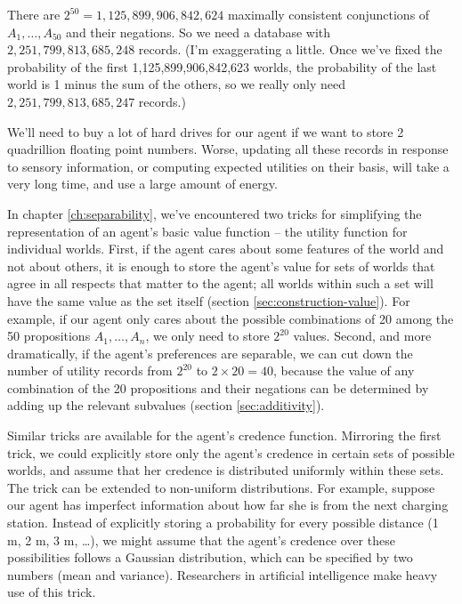 
There are $2^{50} = 1,125,899,906,842,624$ maximally consistent
conjunctions of $A_1,\ldots,A_{50}$ and their negations.  So we need a
database with $2,251,799,813,685,248$ records. (I'm exaggerating a
little. Once we've fixed the probability of the first
1,125,899,906,842,623 worlds, the probability of the last world is 1
minus the sum of the others, so we really only need
$2,251,799,813,685,247$ records.)

We'll need to buy a lot of hard drives for our agent if we want to
store 2 quadrillion floating point numbers. Worse, updating all these
records in response to sensory information, or computing expected
utilities on their basis, will take a very long time, and use a large
amount of energy.

In chapter \ref{ch:separability}, we've encountered two tricks for
simplifying the representation of an agent's basic value function --
the utility function for individual worlds. First, if the agent cares
about some features of the world and not about others, it is enough to
store the agent's value for sets of worlds that agree in all respects
that matter to the agent; all worlds within such a set will have the
same value as the set itself (section
\ref{sec:construction-value}). For example, if our agent only cares
about the possible combinations of 20 among the 50 propositions
$A_1,\ldots,A_n$, we only need to store $2^{20}$ values. Second, and
more dramatically, if the agent's preferences are separable, we can
cut down the number of utility records from $2^{20}$ to $2 \times 20 =
40$, because the value of any combination of the 20 propositions and
their negations can be determined by adding up the relevant subvalues
(section \ref{sec:additivity}).

Similar tricks are available for the agent's credence
function. Mirroring the first trick, we could explicitly store only
the agent's credence in certain sets of possible worlds, and assume
that her credence is distributed uniformly within these sets. The
trick can be extended to non-uniform distributions. For example,
suppose our agent has imperfect information about how far she is from
the next charging station. Instead of explicitly storing a probability
for every possible distance (1 m, 2 m, 3 m, \ldots), we might assume
that the agent's credence over these possibilities follows a Gaussian
distribution, which can be specified by two numbers (mean and
variance). Researchers in artificial intelligence make heavy use of
this trick.

